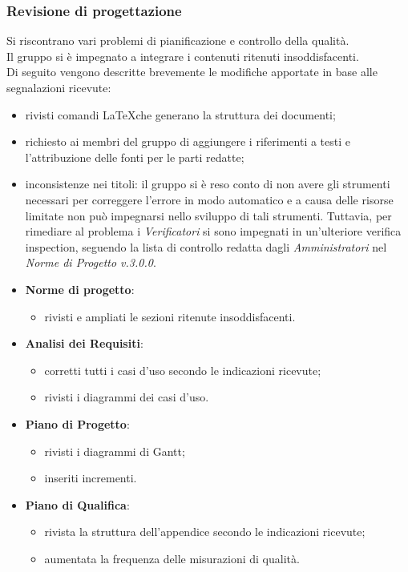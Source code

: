 	\subsubsection{Revisione di progettazione}
	
		Si riscontrano vari problemi di pianificazione e controllo della qualità. \\
		Il gruppo si è impegnato a integrare i contenuti ritenuti insoddisfacenti.\\ 
		 Di seguito vengono descritte brevemente le modifiche apportate in base alle segnalazioni ricevute:
	\begin{itemize}
		\item rivisti comandi \LaTeX \space che generano la struttura dei documenti;
		\item richiesto ai membri del gruppo di aggiungere i riferimenti a testi e l'attribuzione delle fonti per le parti redatte;
		\item inconsistenze nei titoli: il gruppo si è reso conto di non avere gli strumenti necessari per correggere l'errore in modo automatico e a causa delle risorse limitate non può impegnarsi nello sviluppo di tali strumenti. Tuttavia, per rimediare al problema i \textit{Verificatori} si sono impegnati in un'ulteriore verifica inspection\glo, seguendo la lista di controllo redatta dagli \textit{Amministratori} nel \textit{Norme di Progetto v.3.0.0}. 
		\item \textbf{Norme di progetto}: 
			\begin{itemize}	
				\item rivisti e ampliati le sezioni ritenute insoddisfacenti.
			\end{itemize}
		\item \textbf{Analisi dei Requisiti}: 
			\begin{itemize}
				\item corretti tutti i casi d'uso secondo le indicazioni ricevute;
				\item rivisti i diagrammi dei casi d'uso.
			\end{itemize} 
		\item \textbf{Piano di Progetto}: 
			\begin{itemize}
				\item rivisti i diagrammi di Gantt;
				\item inseriti incrementi.
			\end{itemize}
		\item \textbf{Piano di Qualifica}: 
			\begin{itemize}
				\item rivista la struttura dell'appendice secondo le indicazioni ricevute;
				\item aumentata la frequenza delle misurazioni di qualità.
			\end{itemize}
	\end{itemize}
	

